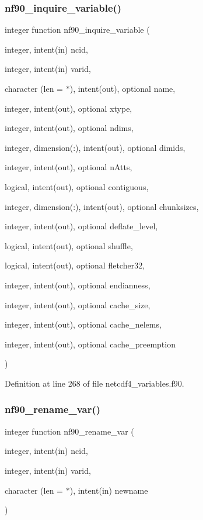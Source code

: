 \subsubsection{\texorpdfstring{nf90\+\_\+inquire\+\_\+variable()}{nf90\_inquire\_variable()}}
{\footnotesize\ttfamily integer function nf90\+\_\+inquire\+\_\+variable (\begin{DoxyParamCaption}\item[{integer, intent(in)}]{ncid,  }\item[{integer, intent(in)}]{varid,  }\item[{character (len = $\ast$), intent(out), optional}]{name,  }\item[{integer, intent(out), optional}]{xtype,  }\item[{integer, intent(out), optional}]{ndims,  }\item[{integer, dimension(\+:), intent(out), optional}]{dimids,  }\item[{integer, intent(out), optional}]{n\+Atts,  }\item[{logical, intent(out), optional}]{contiguous,  }\item[{integer, dimension(\+:), intent(out), optional}]{chunksizes,  }\item[{integer, intent(out), optional}]{deflate\+\_\+level,  }\item[{logical, intent(out), optional}]{shuffle,  }\item[{logical, intent(out), optional}]{fletcher32,  }\item[{integer, intent(out), optional}]{endianness,  }\item[{integer, intent(out), optional}]{cache\+\_\+size,  }\item[{integer, intent(out), optional}]{cache\+\_\+nelems,  }\item[{integer, intent(out), optional}]{cache\+\_\+preemption }\end{DoxyParamCaption})}



Definition at line 268 of file netcdf4\+\_\+variables.\+f90.

\mbox{\label{netcdf4__variables_8f90_aa3779419b3894a821cca28e761077b2c}} 
\subsubsection{\texorpdfstring{nf90\+\_\+rename\+\_\+var()}{nf90\_rename\_var()}}
{\footnotesize\ttfamily integer function nf90\+\_\+rename\+\_\+var (\begin{DoxyParamCaption}\item[{integer, intent(in)}]{ncid,  }\item[{integer, intent(in)}]{varid,  }\item[{character (len = $\ast$), intent(in)}]{newname }\end{DoxyParamCaption})}



